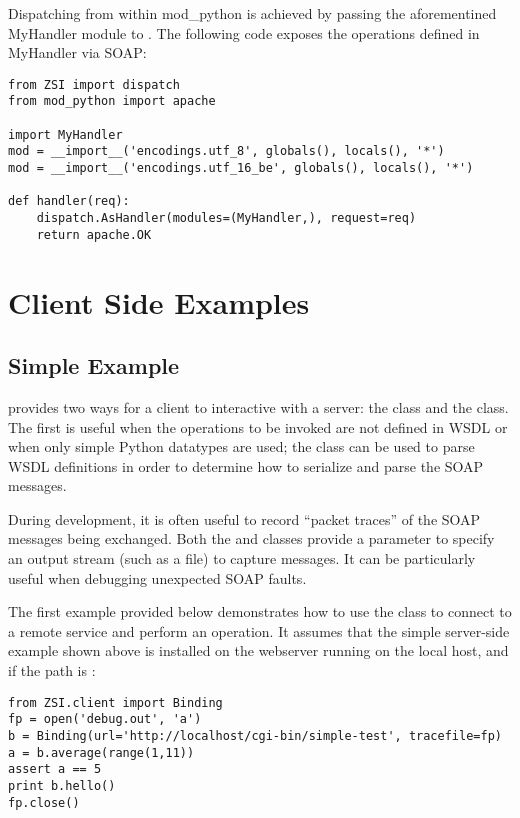 Dispatching from within mod_python is achieved by passing the aforementined
MyHandler module to .  The following code exposes
the operations defined in MyHandler via SOAP:

\begin{verbatim}
from ZSI import dispatch
from mod_python import apache

import MyHandler
mod = __import__('encodings.utf_8', globals(), locals(), '*')
mod = __import__('encodings.utf_16_be', globals(), locals(), '*')

def handler(req):
    dispatch.AsHandler(modules=(MyHandler,), request=req)
    return apache.OK
\end{verbatim}


\section{Client Side Examples}

\subsection{Simple Example}
\ZSI{} provides two ways for a client to interactive with a server:
the  class and the  class.
The first is useful when the operations to be invoked are not defined
in WSDL or when only simple Python datatypes are used; the 
class can be used to parse WSDL definitions in order
to determine how to serialize and parse the SOAP messages.

During development, it is often useful to record ``packet traces'' of
the SOAP messages being exchanged.
Both the  and  classes provide a
 parameter to specify an output stream (such as a file)
to capture messages.
It can be particularly useful when debugging unexpected SOAP faults.

The first example provided below demonstrates how to use the 
class to connect to a remote service and perform an operation.  It assumes
that the simple server-side example shown above is installed on the webserver 
running on the local host, and if the path is :

\begin{verbatim}
from ZSI.client import Binding
fp = open('debug.out', 'a')
b = Binding(url='http://localhost/cgi-bin/simple-test', tracefile=fp)
a = b.average(range(1,11))
assert a == 5
print b.hello()
fp.close()
\end{verbatim}


